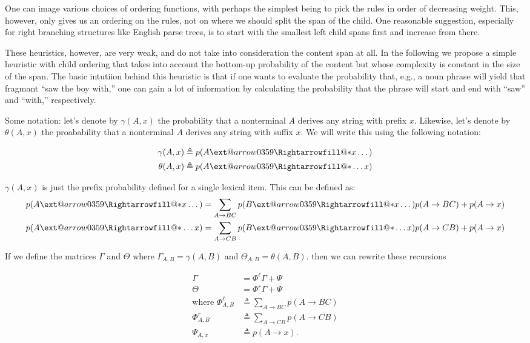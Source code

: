 \documentclass{article}
\makeatletter
\newcommand{\xRightarrow}[2][]{\ext@arrow 0359\Rightarrowfill@{#1}{#2}}
\newcommand{\derives}{\xRightarrow{*}}
\makeatother
\begin{document}
One can image various choices of ordering functions, with perhaps the
simplest being to pick the rules in order of decreasing weight. This,
however, only gives us an ordering on the rules, not on where we
should split the span of the child. One reasonable suggestion,
especially for right branching structures like English parse trees, is
to start with the smallest left child spans first and increase from
there.

These heuristics, however, are very weak, and do not take into
consideration the content span at all. In the following we propose a
simple heuristic with child ordering that takes into account the
bottom-up probability of the content but whose complexity is constant
in the size of the span. The basic intutiion behind this heuristic is
that if one wants to evaluate the probability that, e.g., a noun
phrase will yield that fragmant ``saw the boy with,'' one can gain a
lot of information by calculating the probability that the phrase will
start and end with ``saw'' and ``with,'' respectively. 

Some notation: let's denote by $\gamma(A, x)$ the probability that a
nonterminal $A$ derives any string with prefix $x$. Likewise, let's
denote by $\theta(A, x)$ the proabability that a nonterminal $A$
derives any string with suffix $x$. We will write this using the
following notation:

\begin{align}
  \gamma(A, x) &\triangleq p(A \xRightarrow{*} x\dots) \label{eq:gammaDef}\\
  \theta(A, x) &\triangleq p(A \xRightarrow{*} \dots x)  \label{eq:thetaDef}
\end{align}

$\gamma(A, x)$ is just the prefix probability defined for a single
lexical item. This can be defined as:
\begin{align}
  p(A \derives x\dots) &= \sum_{A \rightarrow BC} p(B \derives x \dots) p(A \rightarrow B C) 
    + p(A \rightarrow x)\\
  p(A \derives \dots x) &= \sum_{A \rightarrow CB} p(B \derives \dots x) p(A \rightarrow C B) 
    + p(A \rightarrow x)
\end{align}

If we define the matrices $\Gamma$ and $\Theta$ where $\Gamma_{A, B} = \gamma(A, B)$
and $\Theta_{A, B} = \theta(A, B)$. then we can rewrite these recursions 

\begin{align}
  \Gamma &= \Phi^\ell \Gamma + \Psi \\
  \Theta &= \Phi^r \Gamma  + \Psi \\
  \text{where }\Phi^\ell_{A, B} &\triangleq \sum_{A \rightarrow B C} p(A \rightarrow B C)\\
               \Phi^r_{A, B} &\triangleq \sum_{A \rightarrow C B} p(A \rightarrow C B)\\
               \Psi_{A, x} &\triangleq p(A \rightarrow x).
\end{align}
\end{document}
